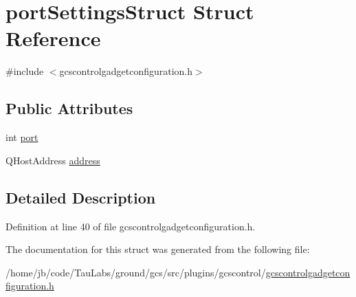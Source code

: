 \hypertarget{structport_settings_struct}{\section{port\-Settings\-Struct \-Struct \-Reference}
\label{structport_settings_struct}
}


{\ttfamily \#include $<$gcscontrolgadgetconfiguration.\-h$>$}

\subsection*{\-Public \-Attributes}
\begin{DoxyCompactItemize}
\item 
int \hyperlink{group___g_c_s_control_gadget_plugin_ga0f8fc6e0cdd5eac4d00a2b169f94c7a3}{port}
\item 
\-Q\-Host\-Address \hyperlink{group___g_c_s_control_gadget_plugin_ga4a1de1267a23f01dad6562a23ddf70f8}{address}
\end{DoxyCompactItemize}


\subsection{\-Detailed \-Description}


\-Definition at line 40 of file gcscontrolgadgetconfiguration.\-h.



\-The documentation for this struct was generated from the following file\-:\begin{DoxyCompactItemize}
\item 
/home/jb/code/\-Tau\-Labs/ground/gcs/src/plugins/gcscontrol/\hyperlink{gcscontrolgadgetconfiguration_8h}{gcscontrolgadgetconfiguration.\-h}\end{DoxyCompactItemize}
